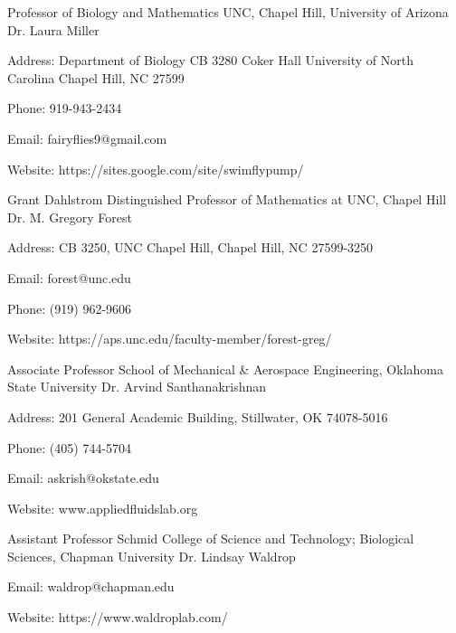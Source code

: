 
  \cventry
    {Professor of Biology and Mathematics UNC, Chapel Hill, University of Arizona} %
    {Dr. Laura Miller} %
    {} %
    {} %
    {
      \begin{cvitems} %
        \item {Address: Department of Biology CB 3280 Coker Hall University of North Carolina Chapel Hill, NC 27599}
        \item {Phone: 919-943-2434}
        \item {Email: fairyflies9@gmail.com }
        \item {Website: https://sites.google.com/site/swimflypump/}
      \end{cvitems}
    }

\cventry
    {Grant Dahlstrom Distinguished Professor of Mathematics at UNC, Chapel Hill} %
    {Dr. M. Gregory Forest} %
    {} %
    {} %
    {
      \begin{cvitems} %
        \item {Address: CB 3250, UNC Chapel Hill, Chapel Hill, NC 27599-3250}
        \item {Email: forest@unc.edu }
        \item {Phone: (919) 962-9606}
        \item {Website: https://aps.unc.edu/faculty-member/forest-greg/}
      \end{cvitems}
    }

\cventry
    {Associate Professor School of Mechanical \& Aerospace Engineering, Oklahoma State University} %
    {Dr. Arvind Santhanakrishnan} %
    {} %
    {} %
    {
      \begin{cvitems} %
        \item {Address: 201 General Academic Building, Stillwater, OK 74078-5016}
        \item {Phone: (405) 744-5704}
        \item {Email: askrish@okstate.edu}
        \item {Website: www.appliedfluidslab.org}
      \end{cvitems}
    }

\cventry
    {Assistant Professor Schmid College of Science and Technology; Biological Sciences, Chapman University} %
    {Dr. Lindsay Waldrop} %
    {} %
    {} %
    {
      \begin{cvitems} %
        \item {Email: waldrop@chapman.edu}
        \item {Website: https://www.waldroplab.com/}
      \end{cvitems}
    }

